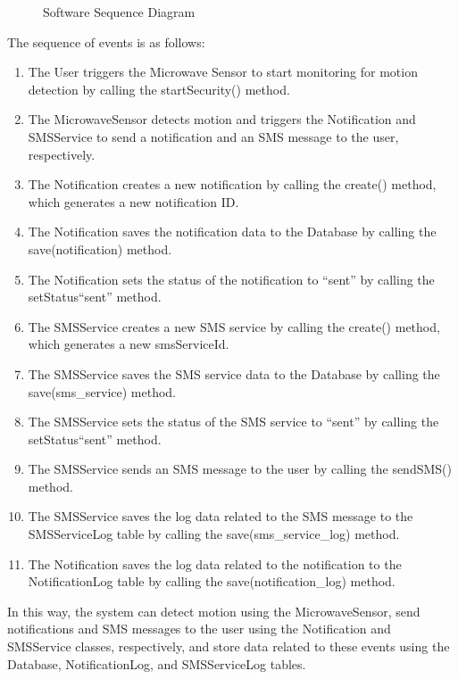\begin{figure}
\begin{sequencediagram}
    \end{sequencediagram}
    \caption{Software Sequence Diagram}
    \label{fig:softwareSeqDiagramUpdated}
\end{figure}

The sequence of events is as follows:
\begin{enumerate}
    \item The User triggers the Microwave Sensor to start monitoring for motion detection
    by calling the startSecurity() method. %
    \item The MicrowaveSensor detects motion and triggers the Notification and SMSService
    to send a notification and an SMS message to the user, respectively. %
    \item The Notification creates a new notification by calling the create() method,
    which generates a new notification ID\@. %
    \item The Notification saves the notification data to the Database by calling the
    save(notification) method. %
    \item The Notification sets the status of the notification to ``sent'' by calling the
    setStatus``sent'' method. %
    \item The SMSService creates a new SMS service by calling the create() method,
    which generates a new smsServiceId. %
    \item The SMSService saves the SMS service data to the Database by calling the
    save(sms\_service) method. %
    \item The SMSService sets the status of the SMS service to ``sent'' by calling the
    setStatus``sent'' method. %
    \item The SMSService sends an SMS message to the user by calling the sendSMS()
    method. %
    \item The SMSService saves the log data related to the SMS message to the
    SMSServiceLog table by calling the save(sms\_service\_log) method. %
    \item The Notification saves the log data related to the notification to the
    NotificationLog table by calling the save(notification\_log) method. %
\end{enumerate}

In this way, the system can detect motion using the MicrowaveSensor, send notifications
and SMS messages to the user using the Notification and SMSService classes, respectively,
and store data related to these events using the Database, NotificationLog, and
SMSServiceLog tables. %

